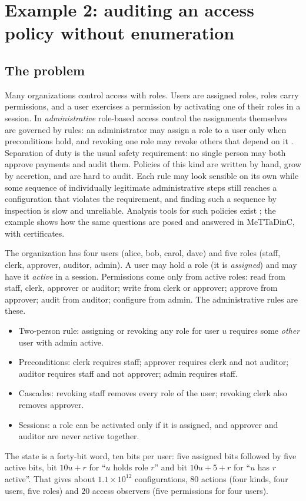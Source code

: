 \documentclass[11pt]{article}
\theoremstyle{definition}
\theoremstyle{plain}
\begin{document}
\section{Example 2: auditing an access policy without enumeration}\label{sec:ex2}

\subsection{The problem}

Many organizations control access with roles. Users are assigned roles, roles carry permissions,
and a user exercises a permission by activating one of their roles in a session. In
\emph{administrative} role-based access control the assignments themselves are governed by rules:
an administrator may assign a role to a user only when preconditions hold, and revoking one role
may revoke others that depend on it \cite{rbac,arbac}. Separation of duty is the usual safety
requirement: no single person may both approve payments and audit them. Policies of this kind are
written by hand, grow by accretion, and are hard to audit. Each rule may look sensible on its own
while some sequence of individually legitimate administrative steps still reaches a configuration
that violates the requirement, and finding such a sequence by inspection is slow and unreliable. Analysis tools for
such policies exist \cite{stoller}; the example shows how the same questions are posed and
answered in MeTTaDinC, with certificates.

The organization has four users (alice, bob, carol, dave) and five roles (staff, clerk, approver,
auditor, admin). A user may hold a role (it is \emph{assigned}) and may have it \emph{active} in a
session. Permissions come only from active roles: read from staff, clerk, approver or auditor;
write from clerk or approver; approve from approver; audit from auditor; configure from admin.
The administrative rules are these.
\begin{itemize}
\item Two-person rule: assigning or revoking any role for user $u$ requires some \emph{other}
user with admin active.
\item Preconditions: clerk requires staff; approver requires clerk and not auditor; auditor requires
staff and not approver; admin requires staff.
\item Cascades: revoking staff removes every role of the user; revoking clerk also removes
approver.
\item Sessions: a role can be activated only if it is assigned, and approver and auditor are never
active together.
\end{itemize}
The state is a forty-bit word, ten bits per user: five assigned bits followed by five active bits,
bit $10u+r$ for ``$u$ holds role $r$'' and bit $10u+5+r$ for ``$u$ has $r$ active''. That gives about
$1.1\times10^{12}$ configurations, $80$ actions (four kinds, four users, five roles) and $20$
access observers (five permissions for four users).
\end{document}
